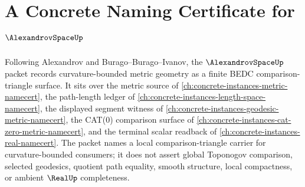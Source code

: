 \chapter{A Concrete Naming Certificate for $\AlexandrovSpaceUp$}
\label{ch:concrete-instances-alexandrov-space-namecert}

Following Alexandrov and Burago--Burago--Ivanov, the $\AlexandrovSpaceUp$ packet records curvature-bounded metric geometry as a finite BEDC comparison-triangle surface. It sits over the metric source of \autoref{ch:concrete-instances-metric-namecert}, the path-length ledger of \autoref{ch:concrete-instances-length-space-namecert}, the displayed segment witness of \autoref{ch:concrete-instances-geodesic-metric-namecert}, the CAT(0) comparison surface of \autoref{ch:concrete-instances-cat-zero-metric-namecert}, and the terminal scalar readback of \autoref{ch:concrete-instances-real-namecert}. The packet names a local comparison-triangle carrier for curvature-bounded consumers; it does not assert global Toponogov comparison, selected geodesics, quotient path equality, smooth structure, local compactness, or ambient $\RealUp$ completeness.

